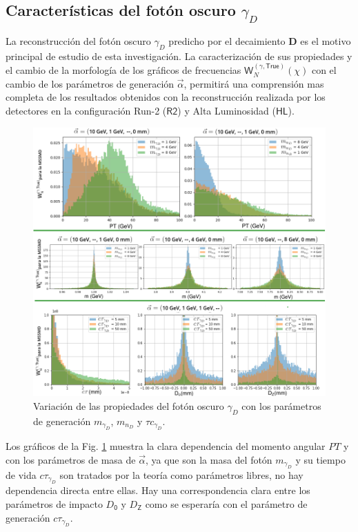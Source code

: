 \subsection{Características del fotón oscuro $\gamma_D$}
La reconstrucción del fotón oscuro $\gamma_D$ predicho por el decaimiento \MSSM\textbf{D} es el motivo principal de estudio de esta investigación. La caracterización de sus propiedades y el cambio de la morfología de los gráficos de frecuencias $\textsf{W}^{(\gamma , \textsf{True})}_N (\chi)$ con el cambio de los parámetros de generación $\vec{\alpha}$, permitirá una comprensión mas completa de los resultados obtenidos con la reconstrucción realizada por los detectores en la configuración Run-2 ($\textsf{R2}$) y Alta Luminosidad ($\textsf{HL}$).


\begin{figure}[!h]
\centering
\includegraphics[width=.9\textwidth]{Simulacion/imagenes/True_PT5.png}
\caption{Variación de las propiedades del fotón oscuro $\gamma_D$ con los parámetros de generación $m_{\gamma_D}$, $m_{n_D}$ y $\tau c_{\gamma_D}$.}
\label{PT_mu_True2}
\end{figure}

Los gráficos de la Fig. \ref{PT_mu_True2} muestra la clara dependencia del momento angular $PT$ y con los parámetros de masa de $\vec{\alpha}$, ya que son la masa del fotón $m_{\gamma_D}$ y su tiempo de vida $c\tau_{\gamma_D}$ son tratados por la teoría como parámetros libres, no hay dependencia directa entre ellas. Hay una correspondencia clara entre los parámetros de impacto $D_\textsf{0}$ y $D_\textsf{Z}$ como se esperaría con el parámetro de generación $c\tau_{\gamma_D}$.


